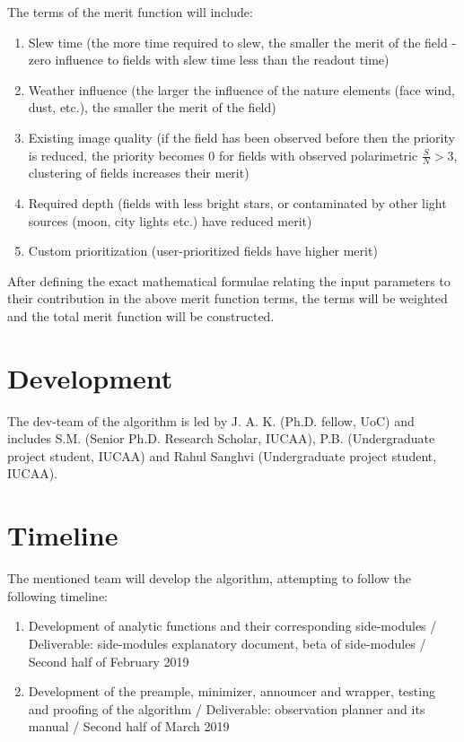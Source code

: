 \documentclass{article}
\begin{document}
The terms of the merit function will include:

\begin{enumerate}
	\item Slew time (the more time required to slew, the smaller the merit of the field - zero influence to fields with slew time less than the readout time)\\
	\item Weather influence (the larger the influence of the nature elements (face wind, dust, etc.), the smaller the merit of the field)\\
	\item Existing image quality (if the field has been observed before then the priority is reduced, the priority becomes 0 for fields with observed polarimetric $\frac{S}{N}>3$, clustering of fields increases their merit)\\
	\item Required depth (fields with less bright stars, or contaminated by other light sources (moon, city lights etc.) have reduced merit)\\
	\item Custom prioritization (user-prioritized fields have higher merit)
\end{enumerate}

After defining the exact mathematical formulae relating the input parameters to their contribution in the above merit function terms, the terms will be weighted and the total merit function will be constructed. 

\section{Development}
The dev-team of the algorithm is led by J. A. K. (Ph.D. fellow, UoC) and includes S.M. (Senior Ph.D. Research Scholar, IUCAA), P.B. (Undergraduate project student, IUCAA) and Rahul Sanghvi (Undergraduate project student, IUCAA).

\section{Timeline}
The mentioned team will develop the algorithm, attempting to follow the following timeline:

\begin{enumerate}
	\item Development of analytic functions and their corresponding side-modules / Deliverable: side-modules explanatory document, beta of side-modules / Second half of February 2019
	\item Development of the preample, minimizer, announcer and wrapper, testing and proofing of the algorithm / Deliverable: observation planner and its manual / Second half of March 2019
\end{enumerate}

\nocite{*}


\end{document}
